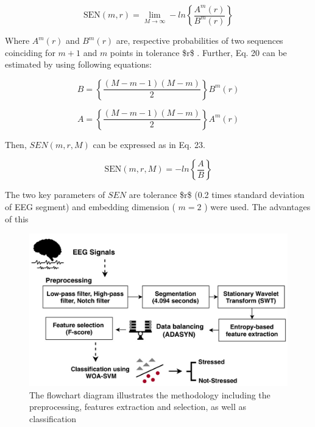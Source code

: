 \begin{equation}
\mathrm{SEN}(m,r)=\operatorname*{lim}_{M\rightarrow\infty}-l n\left\{\frac{A^{m}(r)}{B^{m}(r)}\right\}
\end{equation}

Where $A^{m}(r)$ and $B^{m}(r)$ are, respective probabilities of two sequences coinciding for $m+1$ and $m$ points in tolerance \$r\$ . Further, Eq. 20 can be estimated by using following equations:

\begin{equation}
B=\left\{\frac{(M-m-1)(M-m)}{2}\right\}B^{m}(r)
\end{equation}

\begin{equation}
A=\left\{\frac{(M-m-1)(M-m)}{2}\right\}A^{m}(r)
\end{equation}

Then, $S E N(m,r,M)$ can be expressed as in Eq. 23.

\begin{equation}
\mathrm{SEN}(m,r,M)=-l n\left\{\frac{A}{B}\right\}
\end{equation}

The two key parameters of $S E N$ are tolerance \$r\$ (0.2 times standard deviation of EEG segment) and embedding dimension ( $m=2$ ) were used. The advantages of this

\begin{figure}[htbp]
\centering
\includegraphics[width=0.8\linewidth]{images/d8d76667de39147107030ac4ed1474e9342fd440e0eedd1ab6b3689bd6ec12a0.jpg}
\caption{The flowchart diagram illustrates the methodology including the preprocessing, features extraction and selection, as well as classification}
\label{fig:3}
\end{figure}


